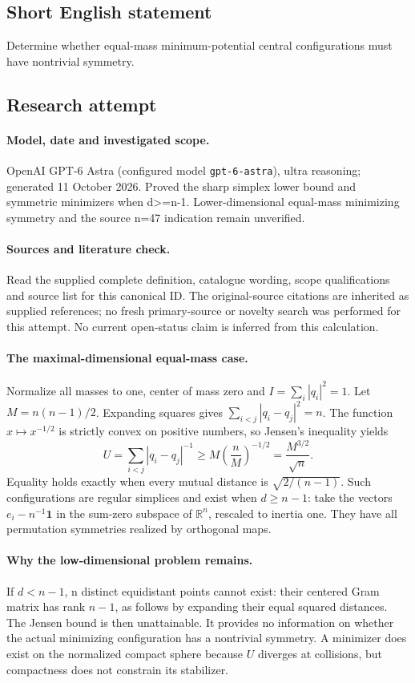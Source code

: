 \documentclass[11pt]{article}
\begin{document}
\subsection{Short English statement}
Determine whether equal-mass minimum-potential central configurations must have nontrivial symmetry.
\subsection{Research attempt}
\paragraph{Model, date and investigated scope.}
OpenAI GPT-6 Astra (configured model \texttt{gpt-6-astra}), ultra reasoning; generated 11 October 2026. Proved the sharp simplex lower bound and symmetric minimizers when d>=n-1. Lower-dimensional equal-mass minimizing symmetry and the source n=47 indication remain unverified.

\paragraph{Sources and literature check.}
Read the supplied complete definition, catalogue wording, scope qualifications and source list for this canonical ID. The original-source citations are inherited as supplied references; no fresh primary-source or novelty search was performed for this attempt. No current open-status claim is inferred from this calculation.

\paragraph{The maximal-dimensional equal-mass case.}Normalize all masses to one, center of mass zero and \(I=\sum_i|q_i|^2=1\). Let \(M=n(n-1)/2\). Expanding squares gives \(\sum_{i<j}|q_i-q_j|^2=n\). The function \(x\mapsto x^{-1/2}\) is strictly convex on positive numbers, so Jensen's inequality yields
\[U=\sum_{i<j}|q_i-q_j|^{-1}\ge M\left(\frac nM\right)^{-1/2}=\frac{M^{3/2}}{\sqrt n}.
\]
Equality holds exactly when every mutual distance is \(\sqrt{2/(n-1)}\). Such configurations are regular simplices and exist when \(d\ge n-1\): take the vectors \(e_i-n^{-1}\mathbf1\) in the sum-zero subspace of \(\mathbb R^n\), rescaled to inertia one. They have all permutation symmetries realized by orthogonal maps.
\paragraph{Why the low-dimensional problem remains.}If \(d<n-1\), n distinct equidistant points cannot exist: their centered Gram matrix has rank \(n-1\), as follows by expanding their equal squared distances. The Jensen bound is then unattainable. It provides no information on whether the actual minimizing configuration has a nontrivial symmetry. A minimizer does exist on the normalized compact sphere because \(U\) diverges at collisions, but compactness does not constrain its stabilizer.
\end{document}
